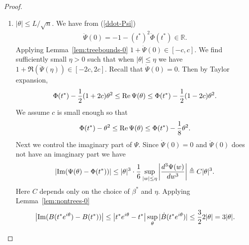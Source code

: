 \documentclass[12pt]{article}
\newcommand{\R}{\mathbb{R}}
\begin{document}
\begin{proof}
\begin{enumerate}
\item 
$ |\theta |\le L/\sqrt{n}$. We have from (\ref{ddot-Psi})
\begin{align*}
\ddot\Psi(0)=-1-(t^*)^2\ddot\Phi(t^*) \in \R.
\end{align*}
Applying Lemma~\ref{lem:treebounds-0} $1+\ddot\Psi(0)\in [-c,c]$. We find sufficiently small $\eta>0$ such that when $|\theta |\le \eta$ we have
$1+\Re(\ddot\Psi(\eta))\in [-2c,2c]$. Recall that $\dot\Psi(0)=0$. Then by Taylor expansion,
\begin{align*}
\Phi(t^*)-{1\over 2}(1+2c)\theta^2 \le \Re\Psi(\theta)\le \Phi(t^*)-{1\over 2}(1-2c)\theta^2.
\end{align*}
We assume $c$ is small enough so that 
\begin{align}
\Phi(t^*)-\theta^2 \le \Re\Psi(\theta)\le \Phi(t^*)-{1\over 8}\theta^2. \label{eq:Phi-double-tail}
\end{align}
Next we control the imaginary part of $\Psi$. Since $\dot \Psi(0)=0$ and $\ddot\Psi(0)$ does not have an imaginary part we have
\begin{align*}
\abs{\Im(\Psi(\theta) - \Phi(t^*))} \leq |\theta|^3 \cdot \frac{1}{6} \sup_{|w| \leq \eta} \abs{{d^3\Psi(w)\over dw^3}}\triangleq C|\theta|^3.
\end{align*}
Here $C$ depends only on the choice of $\beta^*$ and $\eta$. 
Applying Lemma~\ref{lem:nontrees-0}
\begin{align*}
\abs{\Im(B(t^*e^{i\theta}) - B(t^*))} \leq \abs{t^* e^{i\theta} - t^*}\sup_\theta |\dot B(t^*e^{i\theta})| \leq \frac{3}{2}2|\theta |  = 3|\theta|.
\end{align*}



\end{enumerate}
\end{proof}
\end{document}
